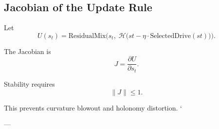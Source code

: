 \subsection{Jacobian of the Update Rule}

Let
\[
U(s_t) =
\mathrm{ResidualMix}\Big(
    s_t,\;
    \mathcal{H}\big(
        st - \eta \cdot \mathrm{SelectedDrive}(st)
    \big)
\Big).
\]

The Jacobian is
\[
J = \frac{\partial U}{\partial s_t}.
\]

Stability requires
\[
\|J\| \le 1.
\]

This prevents curvature blowout and holonomy distortion.
`

---

